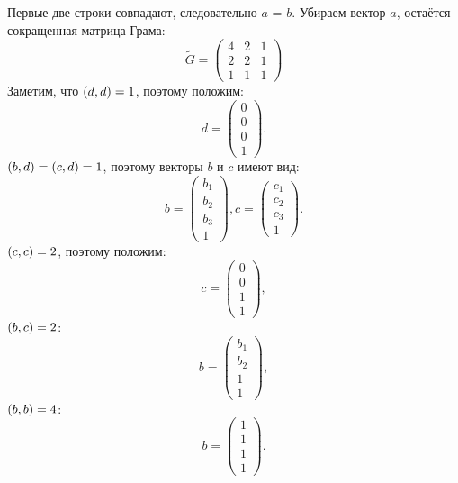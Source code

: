 \documentclass[12pt]{article}
\begin{document}
    Первые две строки совпадают, следовательно $a$ = $b$. Убираем вектор $a$, остаётся сокращенная матрица Грама:
    \[
        \widetilde{G}
        =
        \begin{pmatrix}
            4 & 2 & 1 \\
            2 & 2 & 1 \\
            1 & 1 & 1
        \end{pmatrix}
    \]
    Заметим, что $\left ( d, d \right ) = 1$, поэтому положим:
    \[
        d
        =
        \begin{pmatrix}
            0 \\
            0 \\
            0 \\
            1
        \end{pmatrix}
        .
    \]
    $\left ( b, d \right ) = \left ( c, d \right ) = 1$, поэтому векторы $b$ и $c$ имеют вид:
    \[
        b
        =
        \begin{pmatrix}
            b_1 \\
            b_2 \\
            b_3 \\
            1
        \end{pmatrix},
        c
        =
        \begin{pmatrix}
            c_1 \\
            c_2 \\
            c_3 \\
            1
        \end{pmatrix}.
    \]
    $\left ( c, c \right ) = 2$, поэтому положим:
    \[
        c
        =
        \begin{pmatrix}
            0 \\
            0 \\
            1 \\
            1
        \end{pmatrix},
    \]
    $\left ( b, c \right ) = 2$:
    \[
        b
        =
        \begin{pmatrix}
            b_1 \\
            b_2 \\
            1   \\
            1
        \end{pmatrix},
    \]
    $\left ( b, b \right ) = 4$:
    \[
        b
        =
        \begin{pmatrix}
            1 \\
            1 \\
            1 \\
            1
        \end{pmatrix}.
    \]
\end{document}
